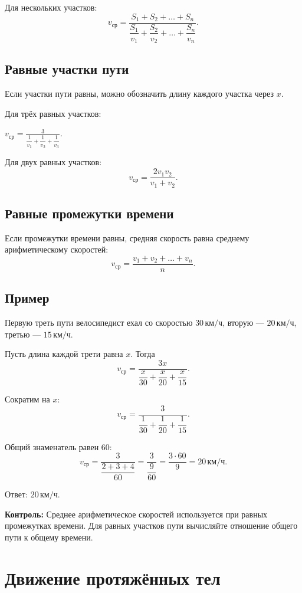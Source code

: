 \documentclass[a4paper,12pt]{article}
\newcommand{\unit}[1]{\,\text{#1}}
\newcommand{\formula}[1]{%
  \begin{center}
    \large\color{darkaccent}\ensuremath{#1}
  \end{center}
}
\newcommand{\checkpoint}[1]{%
  \par\smallskip
  {\color{warn}\textbf{Контроль:} #1}\par\smallskip
}
\begin{document}
Для нескольких участков:
\[
v_{\text{ср}}
=
\frac{S_1+S_2+\dots+S_n}
{\dfrac{S_1}{v_1}
+\dfrac{S_2}{v_2}
+\dots
+\dfrac{S_n}{v_n}}.
\]

\subsection{Равные участки пути}

Если участки пути равны, можно обозначить длину каждого участка через $x$.

Для трёх равных участков:
\formula{
  v_{\text{ср}}
  =
  \frac{3}
  {\dfrac{1}{v_1}
  +\dfrac{1}{v_2}
  +\dfrac{1}{v_3}}.
}

Для двух равных участков:
\[
v_{\text{ср}}
=
\frac{2v_1v_2}{v_1+v_2}.
\]

\subsection{Равные промежутки времени}

Если промежутки времени равны, средняя скорость равна
среднему арифметическому скоростей:
\[
v_{\text{ср}}
=
\frac{v_1+v_2+\dots+v_n}{n}.
\]

\subsection{Пример}

Первую треть пути велосипедист ехал со скоростью
$30\unit{км/ч}$,
вторую --- $20\unit{км/ч}$,
третью --- $15\unit{км/ч}$.

Пусть длина каждой трети равна $x$.
Тогда
\[
v_{\text{ср}}
=
\frac{3x}
{\dfrac{x}{30}
+\dfrac{x}{20}
+\dfrac{x}{15}}.
\]

Сократим на $x$:
\[
v_{\text{ср}}
=
\frac{3}
{\dfrac{1}{30}
+\dfrac{1}{20}
+\dfrac{1}{15}}.
\]

Общий знаменатель равен $60$:
\[
v_{\text{ср}}
=
\frac{3}
{\dfrac{2+3+4}{60}}
=
\frac{3}{\dfrac{9}{60}}
=
\frac{3\cdot60}{9}
=
20\unit{км/ч}.
\]

Ответ: $20\unit{км/ч}$.

\checkpoint{
  Среднее арифметическое скоростей используется при равных промежутках времени.
  Для равных участков пути вычисляйте отношение общего пути к общему времени.
}

\section{Движение протяжённых тел}
\end{document}
